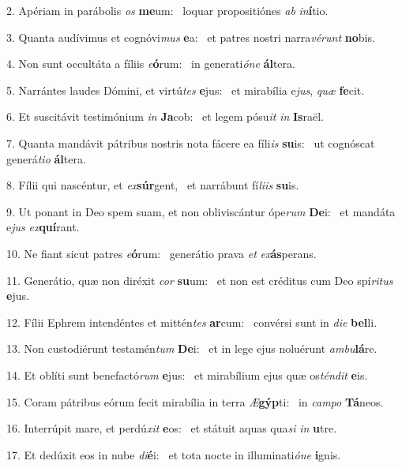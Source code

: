 2. Apériam in parábolis \textit{os} \textbf{me}um: \ast\  loquar propositiónes \textit{ab} \textit{in}\textbf{í}tio.\

3. Quanta audívimus et cognóvi\textit{mus} \textbf{e}a: \ast\  et patres nostri narra\textit{vé}\textit{runt} \textbf{no}bis.\

4. Non sunt occultáta a fíliis \textit{e}\textbf{ó}rum: \ast\  in generati\textit{ó}\textit{ne} \textbf{ál}tera.\

5. Narrántes laudes Dómini, et virtú\textit{tes} \textbf{e}jus: \ast\  et mirabília e\textit{jus}, \textit{quæ} \textbf{fe}cit.\

6. Et suscitávit testimónium \textit{in} \textbf{Ja}cob: \ast\  et legem pósu\textit{it} \textit{in} \textbf{Is}raël.\

7. Quanta mandávit pátribus nostris nota fácere ea fíli\textit{is} \textbf{su}is: \ast\  ut cognóscat generá\textit{ti}\textit{o} \textbf{ál}tera.\

8. Fílii qui nascéntur, et \textit{ex}\textbf{súr}gent, \ast\  et narrábunt fí\textit{li}\textit{is} \textbf{su}is.\

9. Ut ponant in Deo spem suam, et non obliviscántur ópe\textit{rum} \textbf{De}i: \ast\  et mandáta e\textit{jus} \textit{ex}\textbf{quí}rant.\

10. Ne fiant sicut patres \textit{e}\textbf{ó}rum: \ast\  generátio prava \textit{et} \textit{ex}\textbf{ás}perans.\

11. Generátio, quæ non diréxit \textit{cor} \textbf{su}um: \ast\  et non est créditus cum Deo spí\textit{ri}\textit{tus} \textbf{e}jus.\

12. Fílii Ephrem intendéntes et mittén\textit{tes} \textbf{ar}cum: \ast\  convérsi sunt in \textit{di}\textit{e} \textbf{bel}li.\

13. Non custodiérunt testamén\textit{tum} \textbf{De}i: \ast\  et in lege ejus noluérunt \textit{am}\textit{bu}\textbf{lá}re.\

14. Et oblíti sunt benefactó\textit{rum} \textbf{e}jus: \ast\  et mirabílium ejus quæ os\textit{tén}\textit{dit} \textbf{e}is.\

15. Coram pátribus eórum fecit mirabília in terra \textit{Æ}\textbf{gýp}ti: \ast\  in \textit{cam}\textit{po} \textbf{Tá}neos.\

16. Interrúpit mare, et perdú\textit{xit} \textbf{e}os: \ast\  et státuit aquas qua\textit{si} \textit{in} \textbf{u}tre.\

17. Et dedúxit eos in nube \textit{di}\textbf{é}i: \ast\  et tota nocte in illuminati\textit{ó}\textit{ne} \textbf{i}gnis.\

